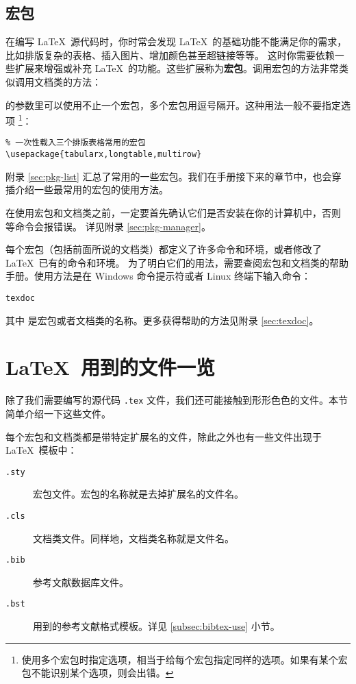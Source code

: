 \subsection{宏包}\label{subsec:packages}

在编写 \LaTeX\ 源代码时，你时常会发现 \LaTeX\ 的基础功能不能满足你的需求，比如排版复杂的表格、插入图片、增加颜色甚至超链接等等。
这时你需要依赖一些扩展来增强或补充 \LaTeX\ 的功能。这些扩展称为\textbf{宏包}。调用宏包的方法非常类似调用文档类的方法：
\begin{command}
\end{command}

的参数里可以使用不止一个宏包，多个宏包用逗号隔开。这种用法一般不要指定选项%
\footnote{使用多个宏包时指定选项，相当于给每个宏包指定同样的选项。如果有某个宏包不能识别某个选项，则会出错。}：
\begin{verbatim}
% 一次性载入三个排版表格常用的宏包
\usepackage{tabularx,longtable,multirow}
\end{verbatim}

附录 \ref{sec:pkg-list} 汇总了常用的一些宏包。我们在手册接下来的章节中，也会穿插介绍一些最常用的宏包的使用方法。

在使用宏包和文档类之前，一定要首先确认它们是否安装在你的计算机中，否则  等命令会报错误。
详见附录 \ref{sec:pkg-manager}。

每个宏包（包括前面所说的文档类）都定义了许多命令和环境，或者修改了 \LaTeX\ 已有的命令和环境。
为了明白它们的用法，需要查阅宏包和文档类的帮助手册。使用方法是在 Windows 命令提示符或者 Linux 终端下输入命令：
\begin{command}
\texttt{texdoc} 
\end{command}

其中  是宏包或者文档类的名称。更多获得帮助的方法见附录 \ref{sec:texdoc}。

\section{\LaTeX\ 用到的文件一览}\label{sec:latex-files}

除了我们需要编写的源代码 \texttt{.tex} 文件，我们还可能接触到形形色色的文件。本节简单介绍一下这些文件。

每个宏包和文档类都是带特定扩展名的文件，除此之外也有一些文件出现于 \LaTeX\ 模板中：
\begin{description}
  \item[\texttt{.sty}] 宏包文件。宏包的名称就是去掉扩展名的文件名。
  \item[\texttt{.cls}] 文档类文件。同样地，文档类名称就是文件名。
  \item[\texttt{.bib}]  参考文献数据库文件。
  \item[\texttt{.bst}]  用到的参考文献格式模板。详见 \ref{subsec:bibtex-use} 小节。
\end{description}

